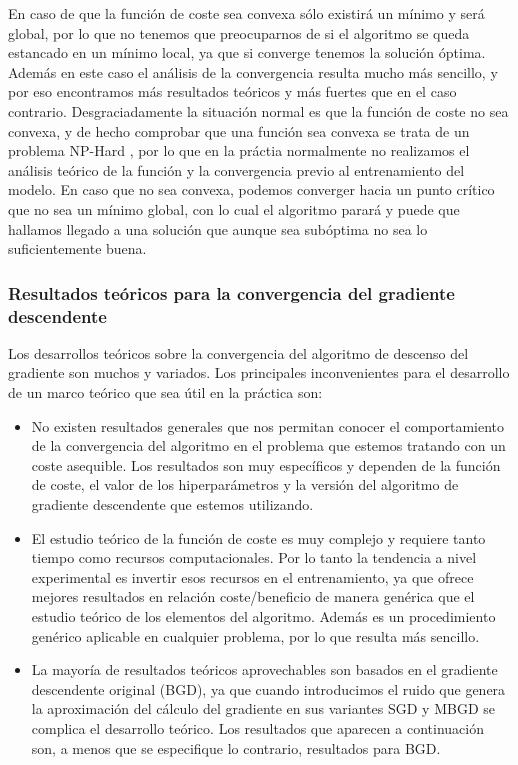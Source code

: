 En caso de que la función de coste sea convexa sólo existirá un mínimo y será global, por lo que no tenemos que preocuparnos de si el algoritmo se queda estancado en un mínimo local, ya que si converge tenemos la solución óptima. Además en este caso el análisis de la convergencia resulta mucho más sencillo, y por eso encontramos más resultados teóricos y más fuertes que en el caso contrario. Desgraciadamente la situación normal es que la función de coste no sea convexa, y de hecho comprobar que una función sea convexa se trata de un problema NP-Hard \cite{Ahmadi_2011_NP_Convex}, por lo que en la práctia normalmente no realizamos el análisis teórico de la función y la convergencia previo al entrenamiento del modelo. En caso que no sea convexa, podemos converger hacia un punto crítico que no sea un mínimo global, con lo cual el algoritmo parará y puede que hallamos llegado a una solución que aunque sea subóptima no sea lo suficientemente buena.



\subsubsection{Resultados teóricos para la convergencia del gradiente descendente}

Los desarrollos teóricos sobre la convergencia del algoritmo de descenso del gradiente son muchos y variados. Los principales inconvenientes para el desarrollo de un marco teórico que sea útil en la práctica son:

\begin{itemize}

    \item No existen resultados generales que nos permitan conocer el comportamiento de la convergencia del algoritmo en el problema que estemos tratando con un coste asequible. Los resultados son muy específicos y dependen de la función de coste, el valor de los hiperparámetros y la versión del algoritmo de gradiente descendente que estemos utilizando.

    \item El estudio teórico de la función de coste es muy complejo y requiere tanto tiempo como recursos computacionales. Por lo tanto la tendencia a nivel experimental es invertir esos recursos en el entrenamiento, ya que ofrece mejores resultados en relación coste/beneficio de manera genérica que el estudio teórico de los elementos del algoritmo. Además es un procedimiento genérico aplicable en cualquier problema, por lo que resulta más sencillo.

    \item La mayoría de resultados teóricos aprovechables son basados en el gradiente descendente original (BGD), ya que cuando introducimos el ruido que genera la aproximación del cálculo del gradiente en sus variantes SGD y MBGD se complica el desarrollo teórico. Los resultados que aparecen a continuación son, a menos que se especifique lo contrario, resultados para BGD.
   
\end{itemize}


